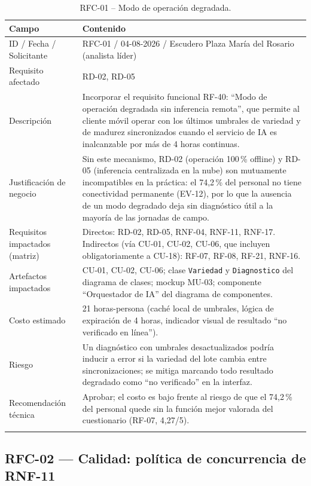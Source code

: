 \documentclass[11pt,a4paper]{article}
\begin{document}
\begin{longtable}{p{3cm}p{10.8cm}}
\toprule
\textbf{Campo} & \textbf{Contenido} \\
\midrule
\endhead
ID / Fecha / Solicitante & RFC-01 / 04-08-2026 / Escudero Plaza María del Rosario (analista líder) \\
Requisito afectado & RD-02, RD-05 \\
Descripción & Incorporar el requisito funcional RF-40: ``Modo de operación degradada sin inferencia remota'', que permite al cliente móvil operar con los últimos umbrales de variedad y de madurez sincronizados cuando el servicio de IA es inalcanzable por más de 4 horas continuas. \\
Justificación de negocio & Sin este mecanismo, RD-02 (operación 100\,\% offline) y RD-05 (inferencia centralizada en la nube) son mutuamente incompatibles en la práctica: el 74,2\,\% del personal no tiene conectividad permanente (EV-12), por lo que la ausencia de un modo degradado deja sin diagnóstico útil a la mayoría de las jornadas de campo. \\
Requisitos impactados (matriz) & Directos: RD-02, RD-05, RNF-04, RNF-11, RNF-17. Indirectos (vía CU-01, CU-02, CU-06, que incluyen obligatoriamente a CU-18): RF-07, RF-08, RF-21, RNF-16. \\
Artefactos impactados & CU-01, CU-02, CU-06; clase \texttt{Variedad} y \texttt{Diagnostico} del diagrama de clases; mockup MU-03; componente ``Orquestador de IA'' del diagrama de componentes. \\
Costo estimado & 21 horas-persona (cach\'e local de umbrales, lógica de expiración de 4 horas, indicador visual de resultado ``no verificado en línea''). \\
Riesgo & Un diagnóstico con umbrales desactualizados podría inducir a error si la variedad del lote cambia entre sincronizaciones; se mitiga marcando todo resultado degradado como ``no verificado'' en la interfaz. \\
Recomendación técnica & Aprobar; el costo es bajo frente al riesgo de que el 74,2\,\% del personal quede sin la función mejor valorada del cuestionario (RF-07, 4,27/5). \\
\bottomrule
\caption{RFC-01 -- Modo de operación degradada.}
\end{longtable}

\subsection{RFC-02 --- Calidad: política de concurrencia de RNF-11}
\end{document}
